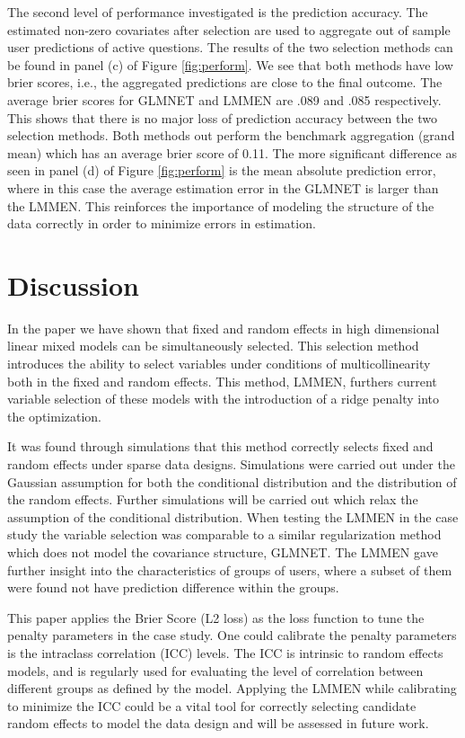 \documentclass{article}
\begin{document}
The second level of performance investigated is the prediction accuracy. The estimated non-zero covariates after selection are used to aggregate out of sample user predictions of active questions. The results of the two selection methods can be found in panel (c) of Figure \ref{fig:perform}. We see that both methods have low brier scores, i.e., the aggregated predictions are close to the final outcome. The average brier scores for GLMNET and LMMEN are .089 and .085 respectively. This shows that there is no major loss of prediction accuracy between the two selection methods. Both methods out perform the benchmark aggregation (grand mean) which has an average brier score of 0.11. The more significant difference as seen in panel (d) of Figure \ref{fig:perform} is the mean absolute prediction error, where in this case the average estimation error in the GLMNET is larger than the LMMEN. This reinforces the importance of modeling the structure of the data correctly in order to minimize errors in estimation.
\section{Discussion}
In the paper we have shown that fixed and random effects in high dimensional linear mixed models can be simultaneously selected. This selection method introduces the ability to select variables under conditions of multicollinearity both in the fixed and random effects. This method, LMMEN, furthers current variable selection of these models with the introduction of a ridge penalty into the optimization.

It was found through simulations that this method correctly selects fixed and random effects under sparse data designs. Simulations were carried out under the Gaussian assumption for both the conditional distribution and the distribution of the random effects. Further simulations will be carried out which relax the assumption of the conditional distribution. When testing the LMMEN in the case study the variable selection was comparable to a similar regularization method which does not model the covariance structure, GLMNET. The LMMEN gave further insight into the characteristics of groups of users, where a subset of them were found not have prediction difference within the groups.

This paper applies the Brier Score (L2 loss) as the loss function to tune the penalty parameters in the case study. One could calibrate the penalty parameters is the intraclass correlation (ICC) levels. The ICC is  intrinsic to random effects models, and is regularly used for evaluating the level of correlation between different groups as defined by the model. Applying the LMMEN while calibrating to minimize the ICC could be a vital tool for correctly selecting candidate random effects to model the data design and will be assessed in future work.
\appendix

{}
\end{document}
